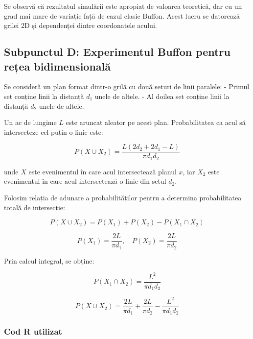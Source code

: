 \documentclass{article}
\begin{document}
Se observă că rezultatul simulării este apropiat de valoarea teoretică, dar cu un grad mai mare de variație față de cazul clasic Buffon. Acest lucru se datorează grilei 2D și dependenței dintre coordonatele acului.

\subsection{Subpunctul D: Experimentul Buffon pentru rețea bidimensională}

Se consideră un plan format dintr-o grilă cu două seturi de linii paralele:  
- Primul set conține linii la distanță \( d_1 \) unele de altele.  
- Al doilea set conține linii la distanță \( d_2 \) unele de altele.  

Un ac de lungime \( L \) este aruncat aleator pe acest plan. Probabilitatea ca acul să intersecteze cel puțin o linie este:

\[
P(X \cup X_2) = \frac{L (2d_2 + 2d_1 - L)}{\pi d_1 d_2}
\]

unde \( X \) este evenimentul în care acul intersectează planul \( x \), iar \( X_2 \) este evenimentul în care acul intersectează o linie din setul \( d_2 \).

Folosim relația de adunare a probabilităților pentru a determina probabilitatea totală de intersecție:

\[
P(X \cup X_2) = P(X_1) + P(X_2) - P(X_1 \cap X_2)
\]

\[
P(X_1) = \frac{2L}{\pi d_1}, \quad P(X_2) = \frac{2L}{\pi d_2}
\]

Prin calcul integral, se obține:

\[
P(X_1 \cap X_2) = \frac{L^2}{\pi d_1 d_2}
\]

\[
P(X \cup X_2) = \frac{2L}{\pi d_1} + \frac{2L}{\pi d_2} - \frac{L^2}{\pi d_1 d_2}
\]

\newpage

\subsubsection*{Cod R utilizat}
\end{document}
